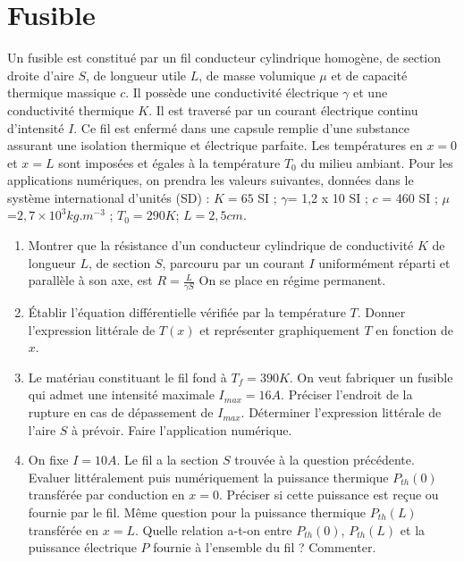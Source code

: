 \documentclass{article}
\begin{document}
\section{Fusible}

Un fusible est constitué par un fil conducteur cylindrique homogène, de section droite d’aire
$S$, de longueur utile $ L$, de masse volumique $\mu$ et de capacité thermique massique $c$. Il possède
une conductivité électrique $\gamma$ et une conductivité thermique $K$. Il est traversé par un courant
électrique continu d’intensité $I$. Ce fil est enfermé dans une capsule remplie d’une substance
assurant une isolation thermique et électrique parfaite. Les températures en $x =0 $ et $ x =L$
sont imposées et égales à la température $T_0$ du milieu ambiant.
Pour les applications numériques, on prendra les valeurs suivantes, données dans le système
international d’unités (SD) : $K = 65$ SI ; $\gamma$= 1,2 x 10 SI ; $c$ = 460 SI ; $\mu$ =$ 2,7 \times 10^3 kg.m^{-3}$ ;
$T_0 =290 K$; $L=2,5 cm$. 

\begin{enumerate}
    \item Montrer que la résistance d'un   conducteur cylindrique de conductivité $K$ de longueur
$L$, de section $S$, parcouru par un courant $I$ uniformément réparti et parallèle à son axe, est
$R=\frac{L}{\gamma S}$ On se place en régime permanent. 
\item Établir l’équation différentielle vérifiée par la température $T$. Donner l’expression littérale
de $T(x)$ et représenter graphiquement $T$ en fonction de $x$. 
\item Le matériau constituant le fil fond à $T_f = 390 K$. On veut fabriquer un fusible qui admet
une intensité maximale $I_{max} = 16 A$.
Préciser l’endroit de la rupture en cas de dépassement de $I_{max}$. Déterminer l’expression littérale de l’aire $S$ à prévoir. Faire l’application numérique. 
\item  On fixe $ I = 10 A$. Le fil a la section $S$ trouvée à la question précédente. Evaluer littéralement puis numériquement la puissance thermique $P_{th}(0)$ transférée par conduction en $x= 0$.
Préciser si cette puissance est reçue ou fournie par le fil. Même question pour la puissance
thermique $P_{th}(L)$ transférée en $x = L$. Quelle relation a-t-on entre $P_{th}(0)$, $P_{th}(L)$ et la puissance
électrique $P$ fournie à l’ensemble du fil ? Commenter. 

\end{enumerate}
\end{document}
